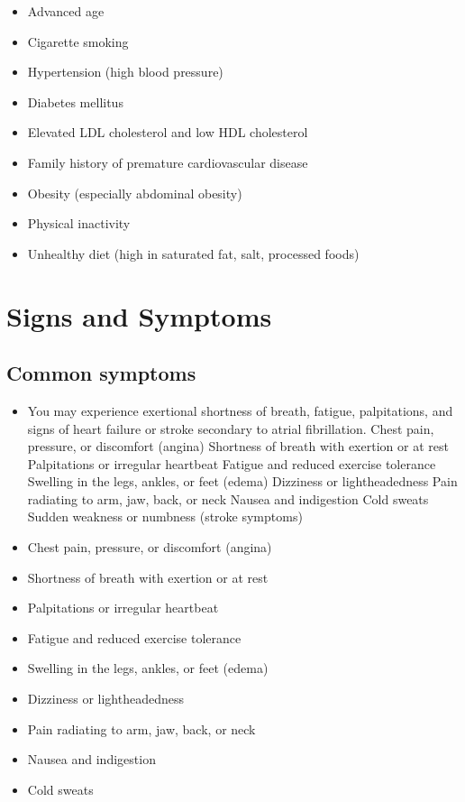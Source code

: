 \begin{itemize}[noitemsep]
  \item Advanced age
  \item Cigarette smoking
  \item Hypertension (high blood pressure)
  \item Diabetes mellitus
  \item Elevated LDL cholesterol and low HDL cholesterol
  \item Family history of premature cardiovascular disease
  \item Obesity (especially abdominal obesity)
  \item Physical inactivity
  \item Unhealthy diet (high in saturated fat, salt, processed foods)
\end{itemize}
\section{Signs and Symptoms}

\subsection{Common symptoms}
\begin{itemize}[noitemsep]
  \item You may experience exertional shortness of breath, fatigue, palpitations, and signs of heart failure or stroke secondary to atrial fibrillation. Chest pain, pressure, or discomfort (angina) Shortness of breath with exertion or at rest Palpitations or irregular heartbeat Fatigue and reduced exercise tolerance Swelling in the legs, ankles, or feet (edema) Dizziness or lightheadedness Pain radiating to arm, jaw, back, or neck Nausea and indigestion Cold sweats Sudden weakness or numbness (stroke symptoms)
  \item Chest pain, pressure, or discomfort (angina)
  \item Shortness of breath with exertion or at rest
  \item Palpitations or irregular heartbeat
  \item Fatigue and reduced exercise tolerance
  \item Swelling in the legs, ankles, or feet (edema)
  \item Dizziness or lightheadedness
  \item Pain radiating to arm, jaw, back, or neck
  \item Nausea and indigestion
  \item Cold sweats
\end{itemize}

